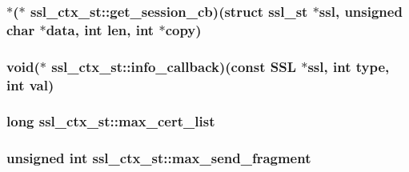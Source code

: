 \hypertarget{structssl__ctx__st_a5c21087395cba272416cde57785ba09b}{
\subsubsection[{get\-\_\-session\-\_\-cb}]{$\ast$($\ast$ ssl\-\_\-ctx\-\_\-st\-::get\-\_\-session\-\_\-cb)(struct {\bf ssl\-\_\-st} $\ast$ssl, unsigned char $\ast$data, int len, int $\ast$copy)}}\label{structssl__ctx__st_a5c21087395cba272416cde57785ba09b}
\hypertarget{structssl__ctx__st_a35ffccaa233ba0815d6c034e3fbb43ef}{
\subsubsection[{info\-\_\-callback}]{\setlength{\rightskip}{0pt plus 5cm}void($\ast$ ssl\-\_\-ctx\-\_\-st\-::info\-\_\-callback)(const S\-S\-L $\ast$ssl, int type, int val)}}\label{structssl__ctx__st_a35ffccaa233ba0815d6c034e3fbb43ef}
\hypertarget{structssl__ctx__st_a7ee4c1615f56a2034547f06d040613df}{
\subsubsection[{max\-\_\-cert\-\_\-list}]{\setlength{\rightskip}{0pt plus 5cm}long ssl\-\_\-ctx\-\_\-st\-::max\-\_\-cert\-\_\-list}}\label{structssl__ctx__st_a7ee4c1615f56a2034547f06d040613df}
\hypertarget{structssl__ctx__st_aab1f54a0e69246d749a6f6ad249c2176}{
\subsubsection[{max\-\_\-send\-\_\-fragment}]{\setlength{\rightskip}{0pt plus 5cm}unsigned int ssl\-\_\-ctx\-\_\-st\-::max\-\_\-send\-\_\-fragment}}\label{structssl__ctx__st_aab1f54a0e69246d749a6f6ad249c2176}
